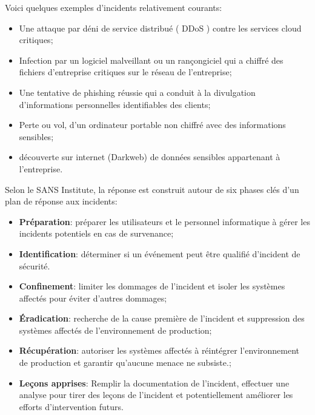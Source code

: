 
Voici quelques exemples d'incidents relativement courants:

\begin{itemize}
  \item Une attaque par déni de service distribué ( DDoS ) contre les services cloud critiques;
  \item  Infection par un logiciel malveillant ou un rançongiciel qui a chiffré des fichiers d'entreprise critiques sur le réseau de l'entreprise;
  \item Une tentative de phishing réussie qui a conduit à la divulgation d'informations personnelles identifiables des clients;
  \item Perte ou vol, d'un ordinateur portable non chiffré avec des informations sensibles;
  \item découverte sur internet (Darkweb) de données sensibles appartenant à l'entreprise.
\end{itemize}

Selon le SANS Institute, la réponse est construit autour de six phases clés d'un plan de réponse aux incidents:

\begin{itemize}
  \item \textbf{Préparation}: préparer les utilisateurs et le personnel informatique à gérer les incidents potentiels en cas de survenance;
  \item \textbf{Identification}: déterminer si un événement peut être qualifié d'incident de sécurité.
  \item \textbf{Confinement}: limiter les dommages de l'incident et isoler les systèmes affectés pour éviter d'autres dommages;
  \item \textbf{Éradication}: recherche de la cause première de l'incident et suppression des systèmes affectés de l'environnement de production;
  \item \textbf{Récupération}: autoriser les systèmes affectés à réintégrer l'environnement de production et garantir qu'aucune menace ne subsiste.;
  \item \textbf{Leçons apprises}: Remplir la documentation de l'incident, effectuer une analyse pour tirer des leçons de l'incident et potentiellement améliorer les efforts d'intervention futurs.
\end{itemize}

